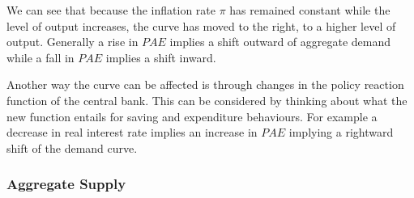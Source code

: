 \documentclass[12pt]{report}
\begin{document}
\begin{flushleft}
We can see that because the inflation rate \(\pi\) has remained constant while
the level of output increases, the curve has moved to the right, to a higher
level of output. Generally a rise in \(PAE\) implies a shift outward of
aggregate demand while a fall in \(PAE\) implies a shift inward. \par
Another way the curve can be affected is through changes in the policy reaction
function of the central bank. This can be considered by thinking about what the
new function entails for saving and expenditure behaviours. For example a
decrease in real interest rate implies an increase in \(PAE\) implying a
rightward shift of the demand curve.

\subsubsection*{Aggregate Supply}


\end{flushleft}
\end{document}
